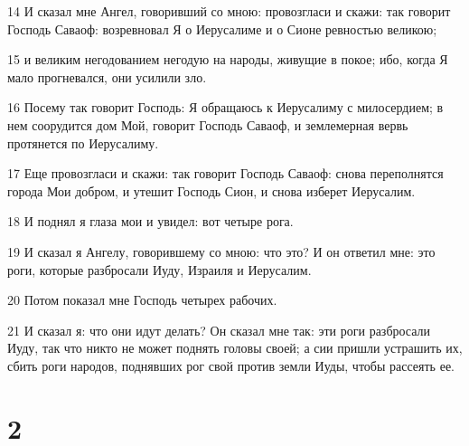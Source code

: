 \par 14 И сказал мне Ангел, говоривший со мною: провозгласи и скажи: так говорит Господь Саваоф: возревновал Я о Иерусалиме и о Сионе ревностью великою;
\par 15 и великим негодованием негодую на народы, живущие в покое; ибо, когда Я мало прогневался, они усилили зло.
\par 16 Посему так говорит Господь: Я обращаюсь к Иерусалиму с милосердием; в нем соорудится дом Мой, говорит Господь Саваоф, и землемерная вервь протянется по Иерусалиму.
\par 17 Еще провозгласи и скажи: так говорит Господь Саваоф: снова переполнятся города Мои добром, и утешит Господь Сион, и снова изберет Иерусалим.
\par 18 И поднял я глаза мои и увидел: вот четыре рога.
\par 19 И сказал я Ангелу, говорившему со мною: что это? И он ответил мне: это роги, которые разбросали Иуду, Израиля и Иерусалим.
\par 20 Потом показал мне Господь четырех рабочих.
\par 21 И сказал я: что они идут делать? Он сказал мне так: эти роги разбросали Иуду, так что никто не может поднять головы своей; а сии пришли устрашить их, сбить роги народов, поднявших рог свой против земли Иуды, чтобы рассеять ее.

\chapter{2}

